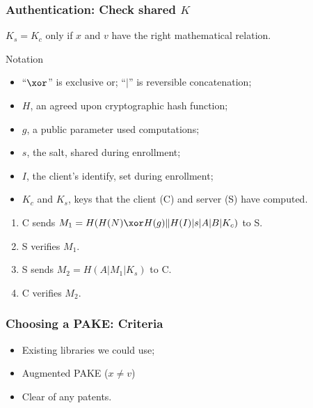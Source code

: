 \documentclass[xcolor={dvipsnames,table,hyperref}]{beamer}
\begin{document}
\begin{frame}
  \frametitle{Authentication: Check shared $K$}
  $K_s = K_c$ only if $x$ and $v$ have the right mathematical relation.

  \begin{block}{Notation}
    \begin{small}
      \begin{itemize}
        \item “$\xor$” is exclusive or; “$|$” is reversible concatenation;
        \item $H$, an agreed upon cryptographic hash function;
        \item $g$, a public parameter used computations;
        \item $s$, the salt, shared during enrollment;
        \item $I$, the client's identify, set during enrollment;
        \item $K_c$ and $K_s$, keys that the client (C) and server (S) have computed.
      \end{itemize}
    \end{small}
  \end{block}
  \begin{enumerate}
    \item C sends  $M_1 = H(H(N) \xor H(g)\| H(I) | s | A | B | K_c)$ to S.
    \item S verifies $M_1$.
    \item S sends $M_2 = H(A | M_1 | K_s)$ to C.
    \item C verifies $M_2$.
  \end{enumerate}
\end{frame}

\begin{frame}
  \frametitle{Choosing a PAKE: Criteria}
  \begin{itemize}
    \item Existing libraries we could use;
    \item Augmented PAKE ($x \neq v$)
    \item Clear of any patents.
  \end{itemize}
\end{frame}
\end{document}
